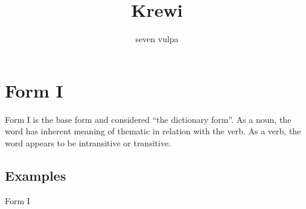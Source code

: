 \documentclass{article}
\title{Krewi}
\author{seven vulpa}
\begin{document}
\maketitle

% 
% 
% 
% 
% 

\section{Form I}
Form I is the base form and considered ``the dictionary form''. As a noun, the word has inherent meaning of thematic in relation with the verb. As a verb, the word appears to be intransitive or transitive.

\subsection{Examples}
Form I

\ex {}\xe


\end{document}
